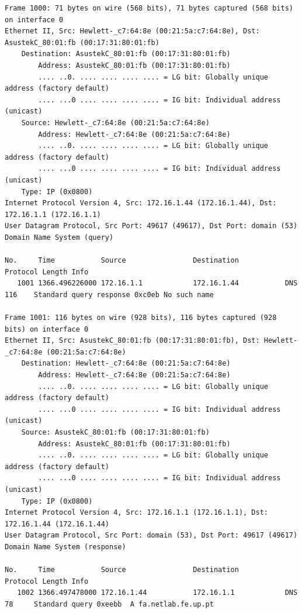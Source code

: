 \documentclass[a4paper,11pt]{article}
\begin{document}
\begin{lstlisting}
Frame 1000: 71 bytes on wire (568 bits), 71 bytes captured (568 bits) on interface 0
Ethernet II, Src: Hewlett-_c7:64:8e (00:21:5a:c7:64:8e), Dst: AsustekC_80:01:fb (00:17:31:80:01:fb)
    Destination: AsustekC_80:01:fb (00:17:31:80:01:fb)
        Address: AsustekC_80:01:fb (00:17:31:80:01:fb)
        .... ..0. .... .... .... .... = LG bit: Globally unique address (factory default)
        .... ...0 .... .... .... .... = IG bit: Individual address (unicast)
    Source: Hewlett-_c7:64:8e (00:21:5a:c7:64:8e)
        Address: Hewlett-_c7:64:8e (00:21:5a:c7:64:8e)
        .... ..0. .... .... .... .... = LG bit: Globally unique address (factory default)
        .... ...0 .... .... .... .... = IG bit: Individual address (unicast)
    Type: IP (0x0800)
Internet Protocol Version 4, Src: 172.16.1.44 (172.16.1.44), Dst: 172.16.1.1 (172.16.1.1)
User Datagram Protocol, Src Port: 49617 (49617), Dst Port: domain (53)
Domain Name System (query)

No.     Time           Source                Destination           Protocol Length Info
   1001 1366.496226000 172.16.1.1            172.16.1.44           DNS      116    Standard query response 0xc0eb No such name

Frame 1001: 116 bytes on wire (928 bits), 116 bytes captured (928 bits) on interface 0
Ethernet II, Src: AsustekC_80:01:fb (00:17:31:80:01:fb), Dst: Hewlett-_c7:64:8e (00:21:5a:c7:64:8e)
    Destination: Hewlett-_c7:64:8e (00:21:5a:c7:64:8e)
        Address: Hewlett-_c7:64:8e (00:21:5a:c7:64:8e)
        .... ..0. .... .... .... .... = LG bit: Globally unique address (factory default)
        .... ...0 .... .... .... .... = IG bit: Individual address (unicast)
    Source: AsustekC_80:01:fb (00:17:31:80:01:fb)
        Address: AsustekC_80:01:fb (00:17:31:80:01:fb)
        .... ..0. .... .... .... .... = LG bit: Globally unique address (factory default)
        .... ...0 .... .... .... .... = IG bit: Individual address (unicast)
    Type: IP (0x0800)
Internet Protocol Version 4, Src: 172.16.1.1 (172.16.1.1), Dst: 172.16.1.44 (172.16.1.44)
User Datagram Protocol, Src Port: domain (53), Dst Port: 49617 (49617)
Domain Name System (response)

No.     Time           Source                Destination           Protocol Length Info
   1002 1366.497478000 172.16.1.44           172.16.1.1            DNS      78     Standard query 0xeebb  A fa.netlab.fe.up.pt


\end{lstlisting}
\end{document}
